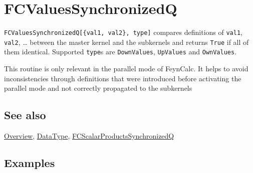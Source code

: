\documentclass[../FeynCalcManual.tex]{subfiles}
\begin{document}
\hypertarget{fcvaluessynchronizedq}{
\section{FCValuesSynchronizedQ}\label{fcvaluessynchronizedq}}

\texttt{FCValuesSynchronizedQ[\allowbreak{}\{\allowbreak{}val1,\ \allowbreak{}val2\},\ \allowbreak{}type]}
compares definitions of \texttt{val1}, \texttt{val2}, \ldots{} between
the master kernel and the subkernels and returns \texttt{True} if all of
them identical. Supported \texttt{type}s are \texttt{DownValues},
\texttt{UpValues} and \texttt{OwnValues}.

This routine is only relevant in the parallel mode of FeynCalc. It helps
to avoid inconsistencies through definitions that were introduced before
activating the parallel mode and not correctly propagated to the
subkernels

\subsection{See also}

\hyperlink{toc}{Overview}, \hyperlink{datatype}{DataType},
\hyperlink{fcscalarproductssynchronizedq}{FCScalarProductsSynchronizedQ}

\subsection{Examples}
\end{document}

